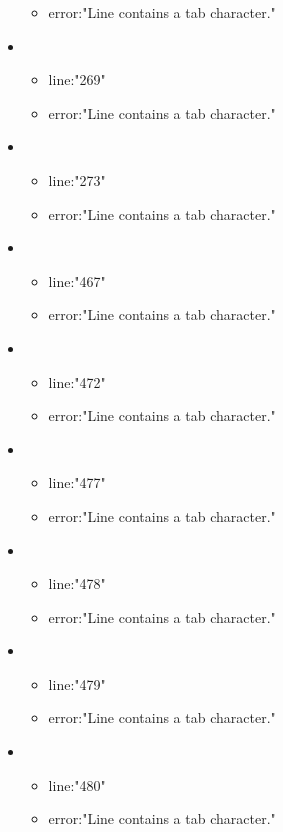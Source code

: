 \begin{itemize}
\begin{itemize}
		\item error:"Line contains a tab character." 
	\end{itemize}
	\item 
	\begin{itemize} 
		\item line:"269" 
		\item error:"Line contains a tab character." 
	\end{itemize}
	\item 
	\begin{itemize} 
		\item line:"273" 
		\item error:"Line contains a tab character." 
	\end{itemize}
	\item 
	\begin{itemize} 
		\item line:"467" 
		\item error:"Line contains a tab character." 
	\end{itemize}
	\item 
	\begin{itemize} 
		\item line:"472" 
		\item error:"Line contains a tab character." 
	\end{itemize}
	\item 
	\begin{itemize} 
		\item line:"477" 
		\item error:"Line contains a tab character." 
	\end{itemize}
	\item 
	\begin{itemize} 
		\item line:"478" 
		\item error:"Line contains a tab character." 
	\end{itemize}
	\item 
	\begin{itemize} 
		\item line:"479" 
		\item error:"Line contains a tab character." 
	\end{itemize}
	\item 
	\begin{itemize} 
		\item line:"480" 
		\item error:"Line contains a tab character." 
	\end{itemize}

\end{itemize}

